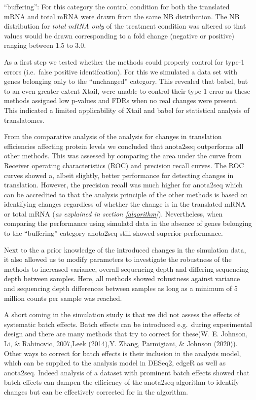 \documentclass[12pt,openany]{book}
\begin{document}
``buffering'': For this category the control condition for both the
translated mRNA and total mRNA were drawn from the same NB distribution.
The NB distribution for \emph{total mRNA only} of the treatment
condition was altered so that values would be drawn corresponding to a
fold change (negative or positive) ranging between 1.5 to 3.0.

As a first step we tested whether the methods could properly control for
type-1 errors (i.e.~false positive identifcation). For this we simulated
a data set with genes belonging only to the ``unchanged'' category. This
revealed that babel, but to an even greater extent Xtail, were unable to
control their type-1 error as these methods assigned low p-values and
FDRs when no real changes were present. This indicated a limited
applicability of Xtail and babel for statistical analysis of
translatomes.

From the comparative analysis of the analysis for changes in translation
efficiencies affecting protein levels we concluded that anota2seq
outperforms all other methods. This was assessed by comparing the area
under the curve from Receiver operating characteristics (ROC) and
precision recall curves. The ROC curves showed a, albeit slightly,
better performance for detecting changes in translation. However, the
precision recall was much higher for anota2seq which can be accredited
to that the analysis principle of the other methods is based on
identifying changes regardless of whether the change is in the
translated mRNA or total mRNA (\emph{as explained in section
\ref{algorithm}}). Nevertheless, when comparing the performance using
simulatd data in the absence of genes belonging to the ``buffering''
category anota2seq still showed superior performance.

Next to the a prior knowledge of the introduced changes in the
simulation data, it also allowed us to modify parameters to investigate
the robustness of the methods to increased variance, overall sequencing
depth and differing sequencing depth between samples. Here, all methods
showed robustness against variance and sequencing depth differences
between samples as long as a minimum of 5 million counts per sample was
reached.

A short coming in the simulation study is that we did not assess the
effects of systematic batch effects. Batch effects can be introduced
e.g.~during experimental design and there are many methods that try to
correct for these(W. E. Johnson, Li, \& Rabinovic, 2007,Leek (2014),Y.
Zhang, Parmigiani, \& Johnson (2020)). Other ways to correct for batch
effects is their inclusion in the analysis model, which can be supplied
to the analysis model in DESeq2, edgeR as well as anota2seq. Indeed
analysis of a dataset with prominent batch effects showed that batch
effects can dampen the efficiency of the anota2seq algorithm to identify
changes but can be effectively corrected for in the algorithm.
\end{document}
